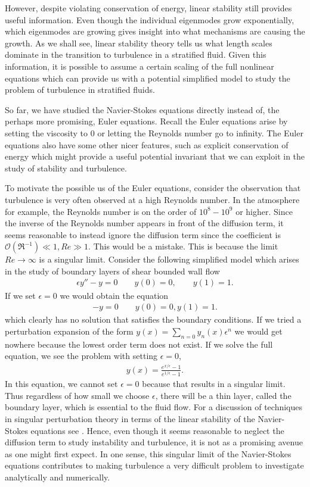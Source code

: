 However, despite violating conservation of energy, linear stability still provides useful information. Even though the individual eigenmodes grow exponentially, which eigenmodes are growing gives insight into what mechanisms are causing the growth. As we shall see, linear stability theory tells us what length scales dominate in the transition to turbulence in a stratified fluid. Given this information, it is possible to assume a certain scaling of the full nonlinear equations which can provide us with a potential simplified model to study the problem of turbulence in stratified fluids. 

So far, we have studied the Navier-Stokes equations directly instead of, the perhaps more promising, Euler equations. Recall the Euler equations arise by setting the viscosity to $0$ or letting the Reynolds number go to infinity. The Euler equations also have some other nicer features, such as explicit conservation of energy which might provide a useful potential invariant that we can exploit in the study of stability and turbulence. 

To motivate the possible us of the Euler equations, consider the observation that turbulence is very often observed at a high Reynolds number. In the atmosphere for example, the Reynolds number is on the order of $10^{8}-10^{9}$ or higher. Since the inverse of the Reynolds number appears in front of the diffusion term, it seems reasonable to instead ignore the diffusion term since the coefficient is $\mathcal{O}(\Re^{-1}) \ll 1, Re\gg 1$. This would be a mistake. This is because the limit $Re\rightarrow\infty$ is a singular limit. Consider the following simplified model which arises in the study of boundary layers of shear bounded wall flow\cite{benderorszag,acheson_fluid,kundu} 
\begin{align}
\epsilon y'' - y =0 \qquad y(0)=0,\qquad y(1)=1.
\end{align}
If we set $\epsilon=0$ we would obtain the equation 
\begin{align}
- y =0 \qquad y(0)=0,y(1)=1.
\end{align}
which clearly has no solution that satisfies the boundary conditions. If we tried a perturbation expansion of the form $y(x) =\sum_{n=0}y_{n}(x)\epsilon^{n}$ we would get nowhere because the lowest order term does not exist. If we solve the full equation, we see the problem with setting $\epsilon=0$,
\begin{align}
y(x) = \frac{e^{x/\epsilon}-1}{e^{1/\epsilon}-1}.
\end{align}
In this equation, we cannot set $\epsilon=0$ because that results in a singular limit. Thus regardless of how small we choose $\epsilon$, there will be a thin layer, called the boundary layer, which is essential to the fluid flow. For a discussion of techniques in singular perturbation theory in terms of the linear stability of the Navier-Stokes equations see \cite{drazinreid,vandyke}. Hence, even though it seems reasonable to neglect the diffusion term to study instability and turbulence, it is not as a promising avenue as one might first expect. In one sense, this singular limit of the Navier-Stokes equations contributes to making turbulence a very difficult problem to investigate analytically and numerically. 

